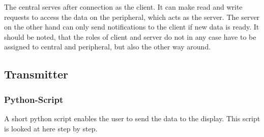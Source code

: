 The central serves after connection as the client.
It can make read and write requests to access the data on the peripheral, which acts as the server.
The server on the other hand can only send notifications to the client if new data is ready.
It should be noted, that the roles of client and server do not in any case have to be assigned to central and peripheral, but also the other way around. 

\subsection{Transmitter}

\subsubsection{Python-Script}
\lstset{basicstyle=\footnotesize}
\lstset{style=mystyle}

A short python script enables the user to send the data to the display.
This script is looked at here step by step.

